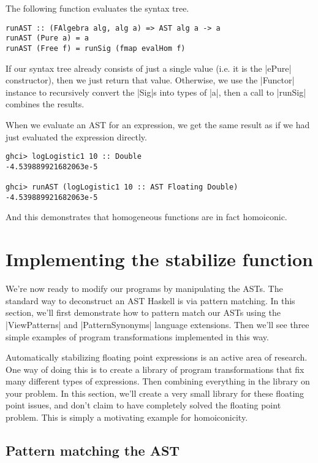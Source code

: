 \documentclass[preprint]{sigplanconf}
\theoremstyle{definition}
\begin{document}
The following function evaluates the syntax tree.
\begin{lstlisting}
runAST :: (FAlgebra alg, alg a) => AST alg a -> a
runAST (Pure a) = a
runAST (Free f) = runSig (fmap evalHom f)
\end{lstlisting}
If our syntax tree already consists of just a single value (i.e. it is the |ePure| constructor),
then we just return that value.
Otherwise, we use the |Functor| instance to recursively convert the |Sig|s into types of |a|, then a call to |runSig| combines the results.

When we evaluate an AST for an expression,
we get the same result as if we had just evaluated the expression directly.
\begin{lstlisting}
ghci> logLogistic1 10 :: Double
-4.539889921682063e-5

ghci> runAST (logLogistic1 10 :: AST Floating Double)
-4.539889921682063e-5
\end{lstlisting}
And this demonstrates that homogeneous functions are in fact homoiconic.


\section{Implementing the stabilize function}
\label{sec:stabilize}

We're now ready to modify our programs by manipulating the ASTs.
The standard way to deconstruct an AST Haskell is via pattern matching.
In this section, we'll first demonstrate how to pattern match our ASTs using the |ViewPatterns| and |PatternSynonyms| language extensions.
Then we'll see three simple examples of program transformations implemented in this way.

Automatically stabilizing floating point expressions is an active area of research.
One way of doing this is to create a library of program transformations that fix many different types of expressions.
Then combining everything in the library on your problem.
In this section, we'll create a very small library for these floating point issues,
and don't claim to have completely solved the floating point problem.
This is simply a motivating example for homoiconicity.

\subsection{Pattern matching the AST}
\end{document}

